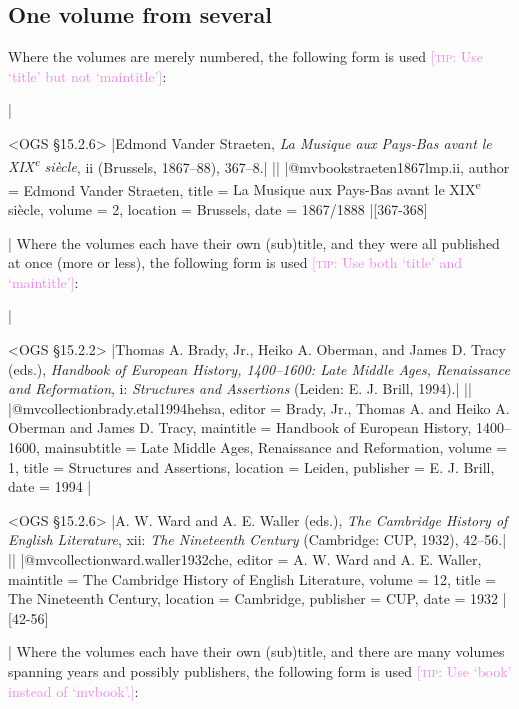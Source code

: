 \documentclass[extrafontsizes,11pt,a4paper,oneside]{memoir}
\newcommand*{\code}[1]{`\textsf{#1}'}
\newcommand*{\aside}[1]{\textcolor{violet}{[\textsc{tip:} #1]}}
\begin{document}
\subsection{One volume from several}

Where the volumes are merely numbered, the following form is used
\aside{Use \code{title} but not \code{maintitle}}:

|

\bibexample<OGS \S15.2.6>
|Edmond Vander Straeten, \emph{La Musique aux Pays-Bas avant le XIX\textsuperscript{e} siècle}, ii (Brussels, 1867--88), 367--8.|%
||%
|@mvbook{straeten1867lmp.ii,
  author = {Edmond Vander Straeten},
  title = {La Musique aux Pays-Bas avant le XIX\textsuperscript{e} siècle},
  volume = {2},
  location = {Brussels},
  date = {1867/1888}
}|[367-368]

\todoc|
Where the volumes each have their own (sub)title,
and they were all published at once (more or less),
the following form is used \aside{Use both \code{title} and \code{maintitle}}:

|

\bibexample<OGS \S15.2.2>
|Thomas A. Brady, Jr., Heiko A. Oberman, and James D. Tracy (eds.), \emph{Handbook of European History, 1400–1600: Late Middle Ages, Renaissance and Reformation}, i: \emph{Structures and Assertions} (Leiden: E. J. Brill, 1994).|%
||%
|@mvcollection{brady.etal1994hehsa,
  editor = {Brady, Jr., Thomas A. and Heiko A. Oberman and James D. Tracy},
  maintitle = {Handbook of European History, 1400–1600},
  mainsubtitle = {{Late} {Middle} {Ages,} {Renaissance} and {Reformation}},
  volume = {1},
  title = {Structures and Assertions},
  location = {Leiden},
  publisher = {E. J. Brill},
  date = {1994}
}|

\bibexample<OGS \S15.2.6>
|A. W. Ward and A. E. Waller (eds.), \emph{The Cambridge History of English Literature}, xii: \emph{The Nineteenth Century} (Cambridge: CUP, 1932), 42--56.|%
||%
|@mvcollection{ward.waller1932che,
  editor = {A. W. Ward and A. E. Waller},
  maintitle = {The Cambridge History of English Literature},
  volume = {12},
  title = {The Nineteenth Century},
  location = {Cambridge},
  publisher = {CUP},
  date = {1932}
}|[42-56]

\todoc|
Where the volumes each have their own (sub)title,
and there are many volumes spanning years and possibly publishers,
the following form is used \aside{Use \code{book} instead of \code{mvbook}.}:
\end{document}
